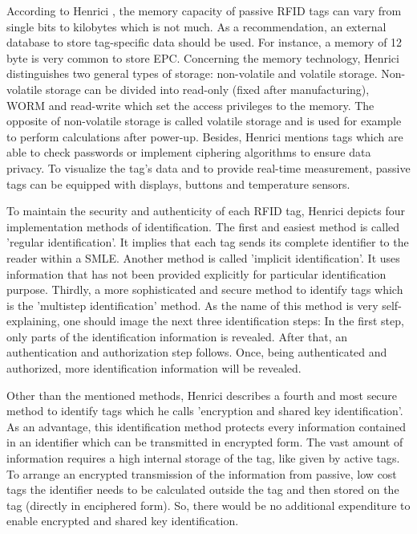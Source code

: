 According to Henrici \cite{henrici}, the memory capacity of passive RFID tags can vary from single bits to kilobytes which is not much. As a recommendation, an external database to store tag-specific data should be used. For instance, a memory of 12 byte is very common to store \ac{EPC}. Concerning the memory technology, Henrici distinguishes two general types of storage: non-volatile and volatile storage. Non-volatile storage can be divided into read-only (fixed after manufacturing), \ac{WORM} and read-write which set the access privileges to the memory. The opposite of non-volatile storage is called volatile storage and is used for example to perform calculations after power-up. Besides, Henrici mentions tags which are able to check passwords or implement ciphering algorithms to ensure data privacy. To visualize the tag's data and to provide real-time measurement, passive tags can be equipped with displays, buttons and temperature sensors. 

To maintain the security and authenticity of each RFID tag, Henrici \cite[p.93 ff.]{henrici} depicts four implementation methods of identification. 
The first and easiest method is called 'regular identification'. It implies that each tag sends its complete identifier to the reader within a \ac{SMLE}. Another method is called 'implicit identification'. It uses information that has not been provided explicitly for particular identification purpose. Thirdly, a more sophisticated and secure method to identify tags which is the 'multistep identification' method. As the name of this method is very self-explaining, one should image the next three identification steps: In the first step, only parts of the identification information is revealed. After that, an authentication and authorization step follows. Once, being authenticated and authorized, more identification information will be revealed. 

Other than the mentioned methods, Henrici describes a fourth and most secure method to identify tags which he calls 'encryption and shared key identification'. As an advantage, this identification method protects every information contained in an identifier which can be transmitted in encrypted form. The vast amount of information requires a high internal storage of the tag, like given by active tags. To arrange an encrypted transmission of the information from passive, low cost tags the identifier needs to be calculated outside the tag and then stored on the tag (directly in enciphered form). So, there would be no additional expenditure to enable encrypted and shared key identification. 

